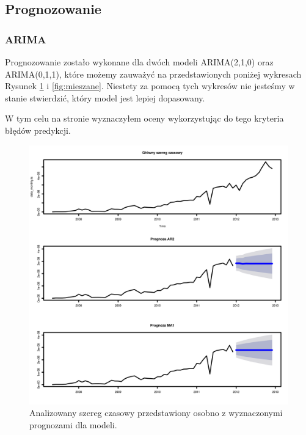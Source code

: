 \documentclass[11pt]{article}
\begin{document}
\newpage

\subsection{Prognozowanie}

\subsubsection{ARIMA}
Prognozowanie zostało wykonane dla dwóch modeli ARIMA(2,1,0) oraz ARIMA(0,1,1), które możemy zauważyć na przedstawionych poniżej wykresach Rysunek \ref{fig:prognozy} i \ref{fig:mieszane}. Niestety za pomocą tych wykresów nie jesteśmy w stanie stwierdzić, który model jest lepiej dopasowany. 

W tym celu na stronie \pageref{tab:tabela} wyznaczyłem oceny wykorzystując do tego kryteria błędów predykcji.

\begin{figure}[h]
    \centering
	\includegraphics[width=\textwidth]{images/prognozy.png}
    \caption{Analizowany szereg czasowy przedstawiony osobno z wyznaczonymi prognozami dla modeli.}
    \label{fig:prognozy}

\end{figure}

\newpage
\end{document}
